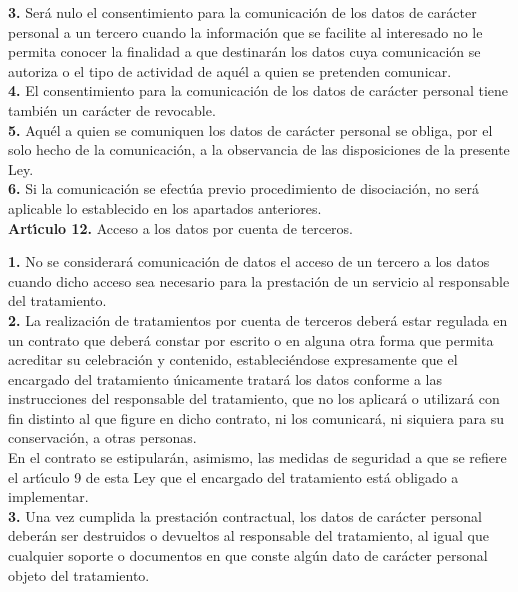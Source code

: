{\bf 3.} Ser\'a nulo el consentimiento para la comunicaci\'on de los datos de 
car\'acter personal a un tercero cuando la informaci\'on que se facilite al 
interesado no le permita conocer la finalidad a que destinar\'an los datos cuya 
comunicaci\'on se autoriza o el tipo de actividad de aqu\'el a quien se 
pretenden comunicar.\\

{\bf 4.} El consentimiento para la comunicaci\'on de los datos de car\'acter 
personal tiene tambi\'en un car\'acter de revocable.\\

{\bf 5.} Aqu\'el a quien se comuniquen los datos de car\'acter personal se 
obliga, por el solo hecho de la comunicaci\'on, a la observancia de las 
disposiciones de la presente Ley.\\

{\bf 6.} Si la comunicaci\'on se efect\'ua previo procedimiento de 
disociaci\'on, no ser\'a aplicable lo establecido en los apartados anteriores.
\vspace{0.3cm}\\
{\large {\bf Art\'{\i}culo 12.} Acceso a los datos por cuenta de terceros.}

{\bf 1.} No se considerar\'a comunicaci\'on de datos el acceso de un tercero a 
los datos cuando dicho acceso sea necesario para la prestaci\'on de un servicio 
al responsable del tratamiento.\\

{\bf 2.} La realizaci\'on de tratamientos por cuenta de terceros deber\'a estar 
regulada en un contrato que deber\'a constar por escrito o en alguna otra forma 
que permita acreditar su celebraci\'on y contenido, estableci\'endose 
expresamente que el encargado del tratamiento \'unicamente tratar\'a los datos 
conforme a las instrucciones del responsable del tratamiento, que no los 
aplicar\'a o utilizar\'a con fin distinto al que figure en dicho contrato, ni 
los comunicar\'a, ni siquiera para su conservaci\'on, a otras personas.\\
En el contrato se estipular\'an, asimismo, las medidas de seguridad a que se 
refiere el art\'{\i}culo 9 de esta Ley que el encargado del tratamiento est\'a 
obligado a implementar.\\

{\bf 3.} Una vez cumplida la prestaci\'on contractual, los datos de car\'acter 
personal deber\'an ser destruidos o devueltos al responsable del tratamiento,
al igual que cualquier soporte o documentos en que conste alg\'un dato de 
car\'acter personal objeto del tratamiento.\\

